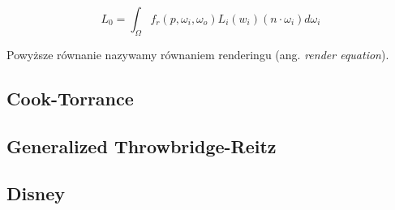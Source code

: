 \documentclass[../main.tex]{subfiles}
\begin{document}
\[
L_0 = \int_{\Omega} {
    f_r(p, \omega_i, \omega_o)
    L_i(w_i)
    (n \cdot \omega_i)
    d \omega_i
}
\]

Powyższe równanie nazywamy równaniem renderingu (ang. \textit{render equation}).

\subsection{Cook-Torrance}


\subsection{Generalized Throwbridge-Reitz}

\subsection{Disney}
\end{document}
